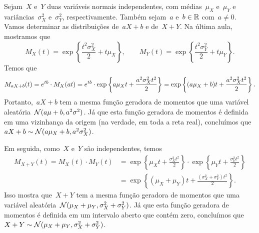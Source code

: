 \begin{example}
Sejam~$X$ e~$Y$ duas variáveis normais independentes, com médias~$\mu_X$ e~$\mu_Y$ e variâncias~$\sigma^2_X$ e~$\sigma^2_Y$, respectivamente. Também sejam~$a$ e~$b \in \mathbb{R}$ com~$a \ne 0$. Vamos determinar as distribuições de~$aX+b$ e de~$X+Y$. Na última aula, mostramos que
\[M_X(t) = \exp\left\{\frac{t^2\sigma_X^2}{2} + t \mu_X \right\},\qquad M_Y(t) = \exp\left\{\frac{t^2\sigma_Y^2}{2} + t \mu_Y \right\}.\]
Temos que
\[M_{aX+b}(t) = e ^{tb}\cdot M_X(at) = e ^{tb}\cdot \exp\left\{ a\mu_X t + \frac{a^2\sigma_X^2t^2}{2}\right\} = \exp\left\{ (a\mu_X + b)t + \frac{a^2 \sigma_X^2 t^2}{2}\right\}. \]
Portanto,~$aX+b$ tem a mesma função geradora de momentos que uma variável aleatória~$\mathcal{N} (a\mu+b,a^2\sigma^2)$.
Já que esta função geradora de momentos é definida em uma vizinhança da origem (na verdade, em toda a reta real), concluímos que~$aX+b \sim \mathcal{N} (a\mu_X+b,a^2\sigma_X^2)$.

Em seguida, como~$X$ e~$Y$ são independentes, temos
\begin{align*}M_{X+Y}(t) = M_X(t)\cdot M_Y(t) &= \exp\left\{\mu_X t + \frac{\sigma_X^2 t^2}{2}\right\} \cdot \exp\left\{\mu_Y t + \frac{\sigma_Y^2 t^2}{2}\right\} \\[.2cm]
&= \exp\left\{(\mu_X+ \mu_Y) t + \frac{(\sigma_X^2+ \sigma^2_Y) t^2}{2}\right\}.\end{align*}
Isso mostra que~$X+Y$ tem a mesma função geradora de momentos que uma variável aleatória~$\mathcal{N} (\mu_X + \mu_Y, \sigma_X^2 + \sigma_Y^2)$.
Já que esta função geradora de momentos é definida em um intervalo aberto que contém zero, concluímos que~$X+Y \sim \mathcal{N} (\mu_X + \mu_Y, \sigma_X^2 + \sigma_Y^2)$.
\end{example}
